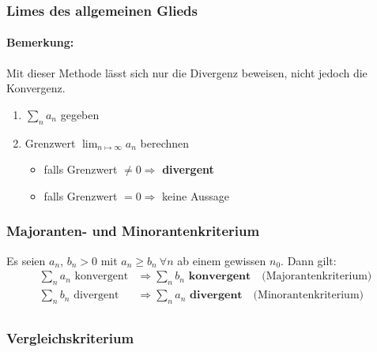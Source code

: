 \documentclass[11pt]{article}
\begin{document}
\subsubsection*{Limes des allgemeinen Glieds}

\paragraph{Bemerkung:} Mit dieser Methode l{\"a}sst sich nur die Divergenz beweisen, nicht jedoch die Konvergenz.

\begin{enumerate}
	\item $\sum_n a_n$ gegeben
	\item Grenzwert $\lim_{n\mapsto\infty} a_n$ berechnen
	\begin{itemize}
		\item falls Grenzwert $\neq 0 \Rightarrow$ \textbf{divergent} 
		\item falls Grenzwert $= 0 \Rightarrow$ keine Aussage 
	\end{itemize}
\end{enumerate}

\subsubsection*{Majoranten- und Minorantenkriterium}

Es seien $a_n$, $b_n > 0$ mit $a_n \geq b_n\ \forall n$ ab einem gewissen $n_0$. Dann gilt: 
\begin{equation*}
\begin{split}
	\sum_n a_n \text{ konvergent} & \Rightarrow \sum_n b_n \textbf{ konvergent}\quad \text{(Majorantenkriterium)} \\
	\sum_n b_n \text{ divergent} & \Rightarrow \sum_n a_n \textbf{ divergent}\quad \text{(Minorantenkriterium)} \\
\end{split}
\end{equation*}

\subsubsection*{Vergleichskriterium}
\end{document}
